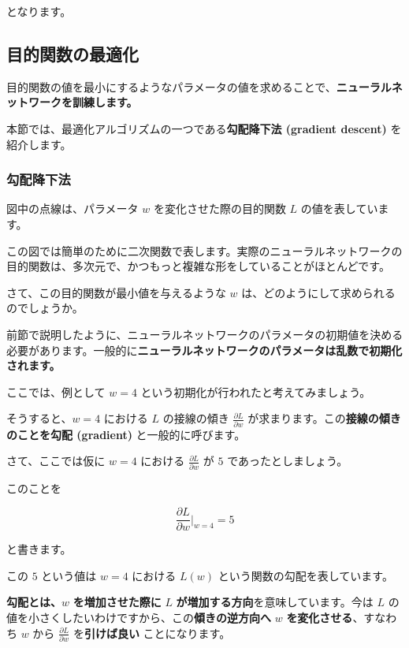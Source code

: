 となります。


\subsection{目的関数の最適化}


目的関数の値を最小にするようなパラメータの値を求めることで、\textbf{ニューラルネットワークを訓練します。}

本節では、最適化アルゴリズムの一つである\textbf{勾配降下法 (gradient descent)} を紹介します。


\subsubsection{勾配降下法}


図中の点線は、パラメータ $w$ を変化させた際の目的関数 $L$ の値を表しています。

この図では簡単のために二次関数で表します。実際のニューラルネットワークの目的関数は、多次元で、かつもっと複雑な形をしていることがほとんどです。

さて、この目的関数が最小値を与えるような $w$ は、どのようにして求められるのでしょうか。




前節で説明したように、ニューラルネットワークのパラメータの初期値を決める必要があります。一般的に\textbf{ニューラルネットワークのパラメータは乱数で初期化されます。}

ここでは、例として $w=4$ という初期化が行われたと考えてみましょう。




そうすると、$w=4$ における $L$ の接線の傾き $\frac{\partial L}{\partial w}$ が求まります。この\textbf{接線の傾きのことを勾配 (gradient)} と一般的に呼びます。


さて、ここでは仮に $w=4$ における $\frac{\partial L}{\partial w}$ が $5$ であったとしましょう。

このことを


\[
\frac{\partial L}{\partial w} \bigg\rvert_{w=4} = 5
\]


と書きます。

この $5$ という値は $w=4$ における $L(w)$ という関数の勾配を表しています。


\textbf{勾配とは、}$w$ \textbf{を増加させた際に} $L$ \textbf{が増加する方向}を意味しています。今は $L$ の値を小さくしたいわけですから、この\textbf{傾きの逆方向へ} $w$ \textbf{を変化させる}、すなわち $w$ から $\frac{\partial L}{\partial w}$ を\textbf{引けば良い} ことになります。


